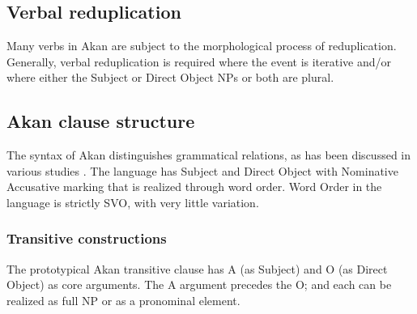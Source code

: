 \documentclass[output=paper]{langsci/langscibook}
\begin{document}
\subsection{Verbal reduplication}\label{§2.2:verbalreduplicaion.osam}

Many verbs in Akan are subject to the morphological process of reduplication. Generally, verbal reduplication is required where the event is iterative and/or where either the Subject or Direct Object NPs or both are plural.

\ea
\label{ex:13.osam}
	\z

	\z
\z


\subsection{Akan clause structure}\label{§2.3:akan.osam}

The syntax of Akan distinguishes grammatical relations, as has been discussed in various studies \citep{osam1994,osam1996,osam1997,osam2000,osam2004}. The language has Subject and Direct Object with Nominative Accusative marking that is realized through word order. Word Order in the language is strictly SVO, with very little variation.

\subsubsection{Transitive constructions}\label{§2.3.1:transitive.osam}

The prototypical Akan transitive clause has A (as Subject) and O (as Direct Object) as core arguments. The A argument precedes the O; and each can be realized as full NP or as a pronominal element.
\end{document}

